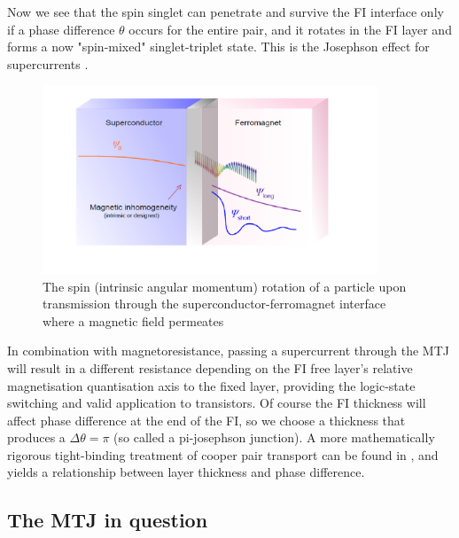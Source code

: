 \documentclass[12pt]{article}
\begin{document}
Now we see that the spin singlet can penetrate and survive the FI interface only if a phase difference $\theta$ occurs for the entire pair, and it rotates in the FI layer and forms a now "spin-mixed" singlet-triplet state. This is the Josephson effect for supercurrents \cite{josephson}. 
\begin{figure}[htp]
    \centering
    \begin{measuredfigure}
    \includegraphics[width=10cm]{rot}
    \caption{The spin (intrinsic angular momentum) rotation of a particle upon transmission through the superconductor-ferromagnet interface where a magnetic field permeates}
    \end{measuredfigure}
    \end{figure}

In combination with magnetoresistance, passing a supercurrent through the MTJ will result in a different resistance depending on the FI free layer's relative magnetisation quantisation axis to the fixed layer, providing the logic-state switching and valid application to transistors. Of course the FI thickness will affect phase difference at the end of the FI, so we choose a thickness that produces a $\Delta\theta=\pi$ (so called a pi-josephson junction). A more mathematically rigorous tight-binding treatment of cooper pair transport can be found in \cite{JMTJpi}, and yields a relationship between layer thickness and phase difference.

\subsection{The MTJ in question}
\end{document}
